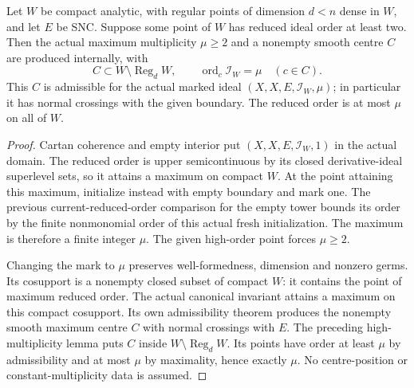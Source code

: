 \begin{theorem}
\label{hir:actual-fresh-maximal-multiplicity-centre}
\leanok
Let $W$ be compact analytic, with regular points of dimension $d<n$ dense
in $W$, and let $E$ be SNC. Suppose some point of $W$ has reduced ideal
order at least two. Then the actual maximum multiplicity $\mu\geq2$
and a nonempty smooth centre $C$ are produced internally, with
\[
 C\subset W\setminus\operatorname{Reg}_d W,
 \qquad\operatorname{ord}_c\mathcal I_W=\mu\quad(c\in C).
\]
This $C$ is admissible for the actual marked ideal
$(X,X,E,\mathcal I_W,\mu)$; in particular it has normal crossings with
the given boundary. The reduced order is at most $\mu$ on all of $W$.
\end{theorem}
\begin{proof}
Cartan coherence and empty interior put $(X,X,E,\mathcal I_W,1)$ in the
actual domain. The reduced order is upper semicontinuous by its closed
derivative-ideal superlevel sets, so it attains a maximum on compact $W$.
At the point attaining this maximum, initialize instead with empty
boundary and mark one. The previous current-reduced-order comparison for
the empty tower bounds its order by the finite nonmonomial order of this
actual fresh initialization. The maximum is therefore a finite integer
$\mu$. The given high-order point forces $\mu\geq2$.

Changing the mark to $\mu$ preserves well-formedness, dimension and
nonzero germs. Its cosupport is a nonempty closed subset of compact $W$:
it contains the point of maximum reduced order. The actual canonical
invariant attains a maximum on this compact cosupport. Its own
admissibility theorem produces the nonempty smooth maximum centre $C$
with normal crossings with $E$. The preceding high-multiplicity lemma
puts $C$ inside $W\setminus\operatorname{Reg}_d W$. Its points have order
at least $\mu$ by admissibility and at most $\mu$ by maximality, hence
exactly $\mu$. No centre-position or constant-multiplicity data is assumed.
\end{proof}


